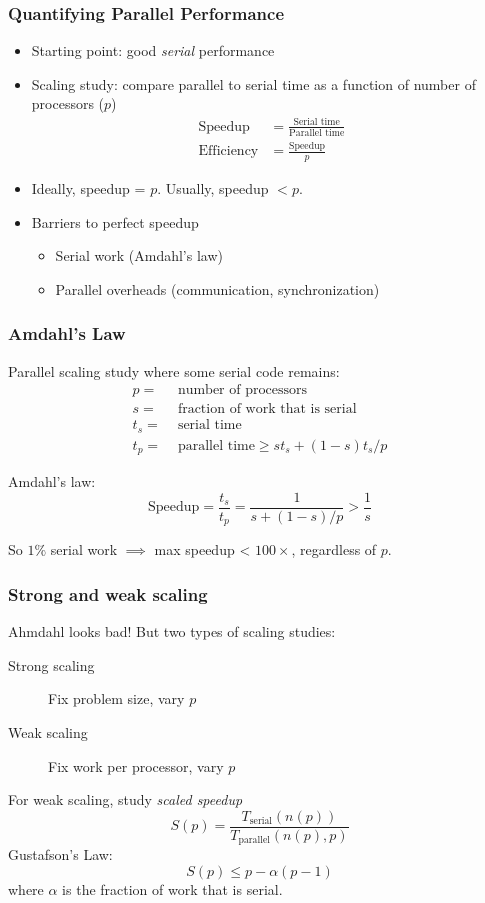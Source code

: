 \documentclass{beamer}
\begin{document}
\begin{frame}
  \frametitle{Quantifying Parallel Performance}
  
  \begin{itemize}
  \item Starting point: good {\em serial} performance
  \item Scaling study: compare parallel to serial time as a function of number of processors ($p$)
    \begin{align*}
      \mbox{Speedup} &= \frac{\mbox{Serial time}}{\mbox{Parallel time}} \\[2mm]
      \mbox{Efficiency} &= \frac{\mbox{Speedup}}{p}
    \end{align*}
  \item
    Ideally, speedup = $p$.  
    Usually, speedup $ < p$.
  \item Barriers to perfect speedup
    \begin{itemize}
    \item Serial work (Amdahl's law)
    \item Parallel overheads (communication, synchronization)
    \end{itemize}
  \end{itemize}
\end{frame}


\begin{frame}
  \frametitle{Amdahl's Law}

  Parallel scaling study where some serial code remains:
  \begin{align*}
    p = & \mbox{ number of processors} \\
    s = & \mbox{ fraction of work that is serial} \\
    t_s = & \mbox{ serial time} \\
    t_p = & \mbox{ parallel time} \geq s t_s + (1-s) t_s / p
  \end{align*}

  \vspace{2mm}
  Amdahl's law:
  \[
    \mbox{Speedup} = 
      \frac{t_s}{t_p} = \frac{1}{s + (1-s) / p} > \frac{1}{s}
  \]

  \vspace{5mm}
  So $1\%$ serial work $\implies$ max speedup < $100 \times$,
  regardless of $p$.
\end{frame}


\begin{frame}
  \frametitle{Strong and weak scaling}

  Ahmdahl looks bad!  But two types of scaling studies:
  \begin{description}
  \item[Strong scaling] Fix problem size, vary $p$
  \item[Weak scaling] Fix work per processor, vary $p$
  \end{description}

  \vspace{5mm}
  For weak scaling, study {\em scaled speedup}
  \[
    S(p) =
    \frac{T_{\mbox{serial}}(n(p))}{T_{\mbox{parallel}}(n(p), p)}
  \]
  Gustafson's Law:
  \[
    S(p) \leq p - \alpha(p-1)
  \]
  where $\alpha$ is the fraction of work that is serial.
\end{frame}
\end{document}
